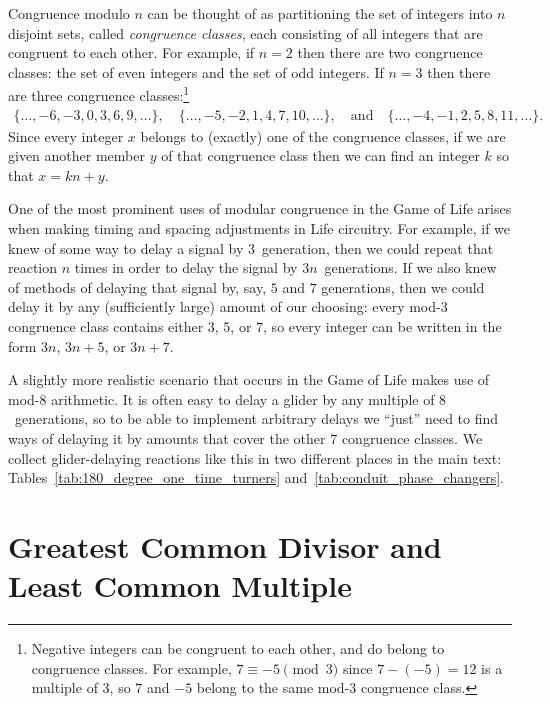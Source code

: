 Congruence modulo $n$ can be thought of as partitioning the set of integers into $n$ disjoint sets, called \emph{congruence classes}, each consisting of all integers that are congruent to each other. For example, if $n = 2$ then there are two congruence classes: the set of even integers and the set of odd integers. If $n = 3$ then there are three congruence classes:\footnote{Negative integers can be congruent to each other, and do belong to congruence classes. For example, $7 \equiv -5 \pmod{3}$ since $7-(-5) = 12$ is a multiple of $3$, so $7$ and $-5$ belong to the same mod-$3$ congruence class.}
\begin{align*}
	\{\ldots, -6, -3, 0, 3, 6, 9, \ldots\}, \quad \{\ldots, -5, -2, 1, 4, 7, 10, \ldots\}, \quad \text{and} \quad \{\ldots, -4, -1, 2, 5, 8, 11, \ldots\}.
\end{align*}
Since every integer $x$ belongs to (exactly) one of the congruence classes, if we are given another member $y$ of that congruence class then we can find an integer $k$ so that $x = kn + y$.

One of the most prominent uses of modular congruence in the Game of Life arises when making timing and spacing adjustments in Life circuitry. For example, if we knew of some way to delay a signal by $3$~generation, then we could repeat that reaction $n$ times in order to delay the signal by $3n$~generations. If we also knew of methods of delaying that signal by, say, $5$ and $7$ generations, then we could delay it by any (sufficiently large) amount of our choosing: every mod-$3$ congruence class contains either $3$, $5$, or $7$, so every integer can be written in the form $3n$, $3n + 5$, or $3n + 7$.

A slightly more realistic scenario that occurs in the Game of Life makes use of mod-$8$ arithmetic. It is often easy to delay a glider by any multiple of $8$~generations, so to be able to implement arbitrary delays we ``just'' need to find ways of delaying it by amounts that cover the other $7$ congruence classes. We collect glider-delaying reactions like this in two different places in the main text: Tables~\ref{tab:180_degree_one_time_turners} and~\ref{tab:conduit_phase_changers}.


\section{Greatest Common Divisor and Least Common Multiple}\label{sec:gcd}

